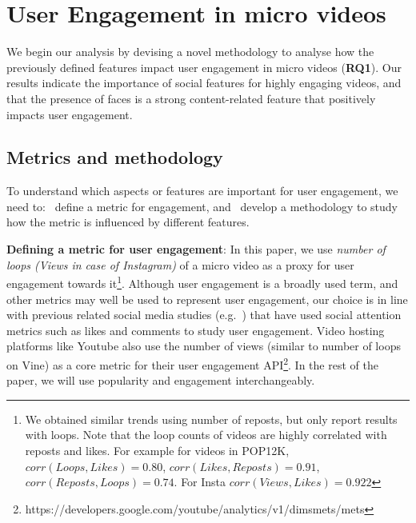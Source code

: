 \section{User Engagement in micro videos}
\label{sec:classifier}
We begin our analysis by devising a novel 
methodology to analyse how the previously defined features impact user engagement in micro videos (\textbf{RQ1}). Our results indicate the importance of social features for highly engaging videos, and that the presence of faces is a strong content-related feature that positively impacts user engagement.

\subsection{Metrics and methodology}
\label{sec:methodology}
To understand which aspects or features are important for user engagement, we need to: \one\ define a metric for engagement, and \two\ develop a methodology to study how the metric is influenced by different features. 

\noindent\textbf{Defining a metric for user engagement}:  In this paper, we  use \emph{number of loops (Views in case of Instagram)} of a micro video as a proxy for user engagement towards it\footnote{We obtained similar trends using number of reposts, but only report results with loops. Note that the loop counts of videos are highly correlated with reposts and likes. For example for videos in POP12K, $ corr(Loops,Likes) = 0.80$, $corr(Likes,Reposts) = 0.91$, $corr(Reposts,Loops) = 0.74$. For Insta $corr(Views, Likes) = 0.922 $}.
Although user engagement is a broadly used term, and other metrics may well be used to represent user engagement, our choice is in line with previous related social media studies (e.g.~\cite{bakhshi2014faces})  that have used social attention metrics such as likes and comments to study user engagement. Video hosting platforms like Youtube also use the number of views (similar to number of loops on Vine) as a core metric for their user engagement API\footnote{\scriptsize https://developers.google.com/youtube/analytics/v1/dimsmets/mets}. In the rest of the paper, we will use popularity and engagement interchangeably.

